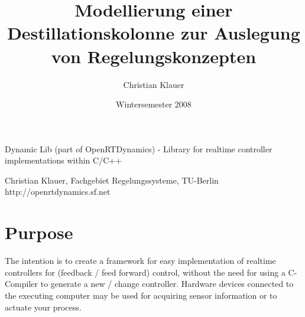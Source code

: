 \documentclass[%
	pdftex,%
	a4paper,%
	oneside,%
	11pt,%
	halfparskip,%
	headsepline,%
	bibtotocnumbered,%
	idxtotoc%
]{scrartcl}
\title{Modellierung einer Destillationskolonne zur Auslegung von Regelungskonzepten}
\author{Christian Klauer}
\date{Wintersemester 2008}
\begin{document}

% 	
% 	
% 	
% 	

\begin{center}
{\huge 
Dynamic Lib (part of OpenRTDynamics) - Library for realtime controller implementations within C/C++}

Christian Klauer, Fachgebiet Regelungssysteme, TU-Berlin \\
http://openrtdynamics.sf.net
\end{center}



\section{Purpose}

The intention is to create a framework for easy implementation of realtime controllers for (feedback / feed forward) control, without the need for using a C-Compiler to generate a new / change controller. Hardware devices connected to the executing computer may be used for acquiring sensor information or to actuate your process.
\end{document}
